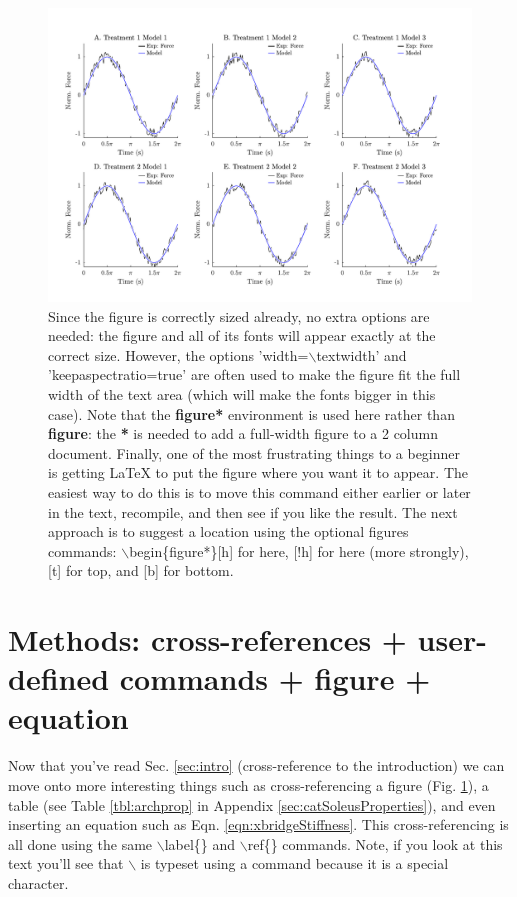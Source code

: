 \documentclass[11pt,twocolumn,a4paper]{article}
\begin{document}
\begin{figure}[!h]
    \centering
    \includegraphics{figures/fig_exampleSingleColumnPlot.pdf}
    \caption{Since the figure is correctly sized already, no extra options are needed: the figure and all of its fonts will appear exactly at the correct size. However, the options 'width=$\backslash$textwidth' and 'keepaspectratio=true' are often used to make the figure fit the full width of the text area (which will make the fonts bigger in this case). Note that the \textbf{figure*} environment is used here rather than \textbf{figure}: the \textbf{*} is needed to add a full-width figure to a 2 column document. Finally, one of the most frustrating things to a beginner is getting \LaTeX{} to put the figure where you want it to appear. The easiest way to do this is to move this command either earlier or later in the text, recompile, and then see if you like the result. The next approach is to suggest a location using the optional figures commands: $\backslash$begin\{figure*\}[h] for here, [!h] for here (more strongly), [t] for top, and [b] for bottom.
    \label{fig:model}}
\end{figure}

\section{Methods: cross-references + user-defined commands + figure + equation}

\label{sec:model}


Now that you've read Sec. \ref{sec:intro} (cross-reference to the introduction) we can move onto more interesting things such as cross-referencing a figure (Fig. \ref{fig:model}), a table (see Table \ref{tbl:archprop} in Appendix \ref{sec:catSoleusProperties}), and even inserting an equation such as Eqn. \ref{eqn:xbridgeStiffness}. 
This cross-referencing is all done using the same $\backslash$label\{\} and $\backslash$ref\{\} commands. Note, if you look at this text you'll see that $\backslash$ is typeset using a command because it is a special character.
\end{document}
